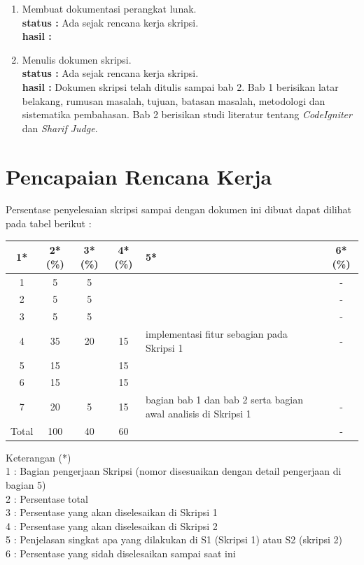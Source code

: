 \documentclass[a4paper,twoside]{article}
\begin{document}
\begin{enumerate}
		\item Membuat dokumentasi perangkat lunak.\\
		{\bf status :} Ada sejak rencana kerja skripsi.\\
		{\bf hasil :} 
		
		\item Menulis dokumen skripsi.\\
		{\bf status :} Ada sejak rencana kerja skripsi.\\
		{\bf hasil :} Dokumen skripsi telah ditulis sampai bab 2. Bab 1 berisikan latar belakang, rumusan masalah, tujuan, batasan masalah, metodologi dan sistematika pembahasan. Bab 2 berisikan studi literatur tentang \textit{CodeIgniter} dan \textit{Sharif Judge}. 
		
	\end{enumerate}

\section{Pencapaian Rencana Kerja}
Persentase penyelesaian skripsi sampai dengan dokumen ini dibuat dapat dilihat pada tabel berikut :

\begin{center}
  \begin{tabular}{ | c | c | c | c | l | c |}
    \hline
    1*  & 2*(\%) & 3*(\%) & 4*(\%) &5* &6*(\%)\\ \hline \hline
    1   & 5 & 5 &  &  & -\\ \hline
    2   & 5 & 5 &  &  & -\\ \hline
    3   & 5 & 5 &  &  & -\\ \hline
    4   & 35 & 20 & 15 &  {\footnotesize implementasi fitur sebagian pada Skripsi 1}& - \\ \hline
    5   & 15 &    & 15 &  &\\ \hline
    6   & 15 &    & 15 &  &\\ \hline
    7   & 20 & 5  & 15 &  {\footnotesize bagian bab 1 dan bab 2 serta bagian awal analisis di Skripsi 1}& - \\ \hline
    Total  & 100  & 40  & 60 &  & -\\ \hline
                          \end{tabular}
\end{center}

Keterangan (*)\\
1 : Bagian pengerjaan Skripsi (nomor disesuaikan dengan detail pengerjaan di bagian 5)\\
2 : Persentase total \\
3 : Persentase yang akan diselesaikan di Skripsi 1 \\
4 : Persentase yang akan diselesaikan di Skripsi 2 \\
5 : Penjelasan singkat apa yang dilakukan di S1 (Skripsi 1) atau S2 (skripsi 2)\\
6 : Persentase yang sidah diselesaikan sampai saat ini 
\end{document}
